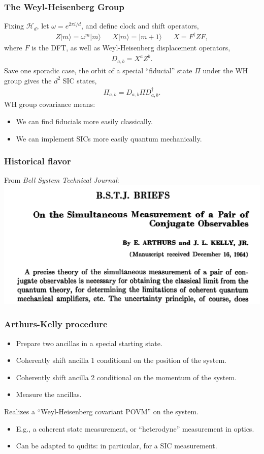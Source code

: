 \documentclass{beamer}
\begin{document}
\begin{frame}
\frametitle{The Weyl-Heisenberg Group}
Fixing $\mathcal{H}_d$, let $\omega = e^{2\pi i /d}$, and define clock and shift operators,
\begin{align}
Z|m\rangle = \omega^{m}|m\rangle && 	X|m\rangle = |m+1\rangle && X=F^\dagger Z F,
\end{align}	
where $F$ is the DFT, as well as Weyl-Heisenberg displacement operators,
\begin{align}
D_{a,b} = X^a Z^b	.
\end{align}
Save one sporadic case, the orbit of a special ``fiducial'' state $\Pi$ under the WH group gives the $d^2$ SIC states,
\begin{align}
	\Pi_{a,b}=D_{a,b} \Pi D_{a,b}^\dagger.
\end{align}
WH group covariance means:
\begin{itemize}
\item We can find fiducials more easily classically.
\item We can implement SICs more easily quantum mechanically.
\end{itemize}
\end{frame}

\begin{frame}
\frametitle{Historical flavor}
From \emph{Bell System Technical Journal}:
\includegraphics[scale=0.5]{img/ak_ref}	
\end{frame}

\begin{frame}
\frametitle{Arthurs-Kelly procedure}
\begin{itemize}
\item Prepare two ancillas in a special starting state.
\item Coherently shift ancilla 1 conditional on the position of the system.
\item Coherently shift ancilla 2 conditional on the momentum of the system.
\item Measure the ancillas.
\end{itemize}
 Realizes a ``Weyl-Heisenberg covariant POVM'' on the system.

\begin{itemize}
\item E.g., a coherent state measurement, or ``heterodyne'' measurement in optics.
\item Can be adapted to qudits: in particular, for a SIC measurement.
\end{itemize}
	
\end{frame}
\end{document}
